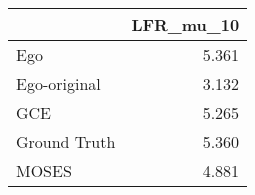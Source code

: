 \begin{tabular}{lr}
\toprule
{} & LFR_mu_10 \\
\midrule
Ego          &     5.361 \\
Ego-original &     3.132 \\
GCE          &     5.265 \\
Ground Truth &     5.360 \\
MOSES        &     4.881 \\
\bottomrule
\end{tabular}
